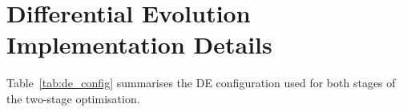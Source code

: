 \documentclass[a4paper,fleqn,longmktitle]{cas-sc}
\begin{document}
	

	\appendix

	\section{Differential Evolution Implementation Details}
	\label{app:de}
	
	Table~\ref{tab:de_config} summarises the DE configuration used
	for both stages of the two-stage optimisation.
\end{document}
